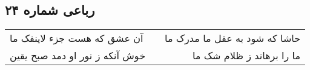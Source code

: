 \begin{center}
\section*{رباعی شماره ۲۴}
\label{sec:sh024}
\begin{longtable}{l p{0.5cm} r}
آن عشق که هست جزء لاینفک ما
&&
حاشا که شود به عقل ما مدرک ما
\\
خوش آنکه ز نور او دمد صبح یقین
&&
ما را برهاند ز ظلام شک ما
\\
\end{longtable}
\end{center}

